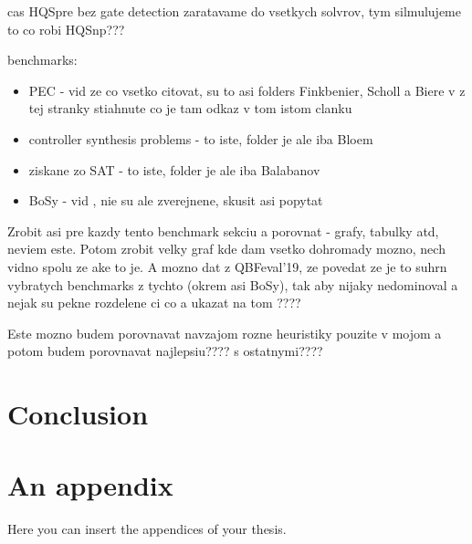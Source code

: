 \documentclass[
  digital, %
  twoside, %
  table,   %
  nolof,     %
  nolot,     %
]{fithesis3}
\theoremstyle{definition}
\theoremstyle{remark}
\begin{document}
cas HQSpre bez gate detection zaratavame do vsetkych solvrov, tym silmulujeme to co robi HQSnp???

benchmarks:
\begin{itemize}
    \item PEC - vid \cite{HQSquantifierLocalization} ze co vsetko citovat, su to asi folders Finkbenier, Scholl a Biere v z tej stranky stiahnute co je tam odkaz v tom istom clanku
    \item controller synthesis problems - to iste, folder je ale iba Bloem
    \item ziskane zo SAT - to iste, folder je ale iba Balabanov
    \item BoSy - vid \cite{dCAQE}, nie su ale zverejnene, skusit asi popytat
\end{itemize}
Zrobit asi pre kazdy tento benchmark sekciu a porovnat - grafy, tabulky atd, neviem este. Potom zrobit velky graf kde dam vsetko dohromady mozno, nech vidno spolu ze ake to je. A mozno dat z QBFeval'19, ze povedat ze je to suhrn vybratych benchmarks z tychto (okrem asi BoSy), tak aby nijaky nedominoval a nejak su pekne rozdelene ci co a ukazat na tom ????

Este mozno budem porovnavat navzajom rozne heuristiky pouzite v mojom a potom budem porovnavat najlepsiu???? s ostatnymi????

\chapter*{Conclusion}

\printbibliography[heading=bibintoc]



\appendix %
\chapter{An appendix}
Here you can insert the appendices of your thesis.
\end{document}
